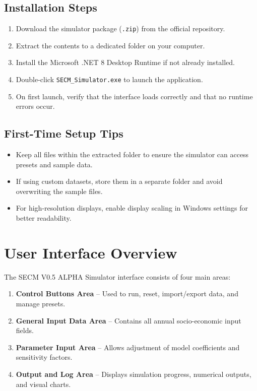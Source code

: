 \documentclass[12pt,a4paper]{article}
\begin{document}
\subsection{Installation Steps}
\begin{enumerate}
    \item Download the simulator package (\texttt{.zip}) from the official repository.
    \item Extract the contents to a dedicated folder on your computer.
    \item Install the Microsoft .NET 8 Desktop Runtime if not already installed.
    \item Double-click \texttt{SECM\_Simulator.exe} to launch the application.
    \item On first launch, verify that the interface loads correctly and that no runtime errors occur.
\end{enumerate}

\subsection{First-Time Setup Tips}
\begin{itemize}
    \item Keep all files within the extracted folder to ensure the simulator can access presets and sample data.
    \item If using custom datasets, store them in a separate folder and avoid overwriting the sample files.
    \item For high-resolution displays, enable display scaling in Windows settings for better readability.
\end{itemize}

\newpage
\section{User Interface Overview}

The SECM V0.5 ALPHA Simulator interface consists of four main areas:

\begin{enumerate}
    \item \textbf{Control Buttons Area} – Used to run, reset, import/export data, and manage presets.
    \item \textbf{General Input Data Area} – Contains all annual socio-economic input fields.
    \item \textbf{Parameter Input Area} – Allows adjustment of model coefficients and sensitivity factors.
    \item \textbf{Output and Log Area} – Displays simulation progress, numerical outputs, and visual charts.
\end{enumerate}
\end{document}
